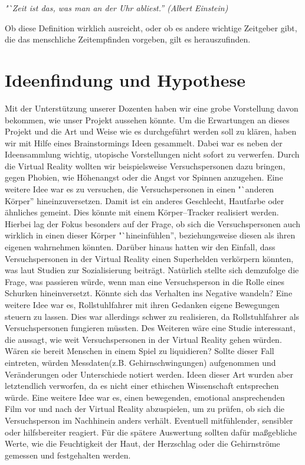 \documentclass{Bericht}
\begin{document}
	\textit{"`Zeit ist das, was man an der Uhr abliest.'' (Albert Einstein)}

	Ob diese Definition wirklich ausreicht, oder ob es andere wichtige Zeitgeber gibt, die das menschliche Zeitempfinden vorgeben, gilt es herauszufinden. 

\section{Ideenfindung und Hypothese} %
	Mit der Unterstützung unserer Dozenten haben wir eine grobe Vorstellung davon bekommen, wie unser Projekt aussehen könnte. Um die Erwartungen an dieses Projekt und die Art und Weise wie es durchgeführt werden soll zu klären, haben wir mit Hilfe eines Brainstormings Ideen gesammelt. Dabei war es neben der Ideensammlung wichtig, utopische Vorstellungen nicht sofort zu verwerfen. Durch die Virtual Reality wollten wir beispielsweise Versuchspersonen dazu bringen, gegen Phobien, wie Höhenangst oder die Angst vor Spinnen anzugehen. Eine weitere Idee war es zu versuchen, die Versuchspersonen in einen "`anderen Körper'' hineinzuversetzen. Damit ist ein anderes Geschlecht, Hautfarbe oder ähnliches gemeint. Dies könnte mit einem Körper–Tracker realisiert werden. Hierbei lag der Fokus besonders auf der Frage, ob sich die Versuchspersonen auch wirklich in einen dieser Körper "`hineinfühlen'', beziehungsweise diesen als ihren eigenen wahrnehmen könnten. Darüber hinaus hatten wir den Einfall, dass Versuchspersonen in der Virtual Reality einen Superhelden verkörpern könnten, was laut Studien zur Sozialisierung beiträgt. 
Natürlich stellte sich demzufolge die Frage, was passieren würde, wenn man eine Versuchsperson in die Rolle eines Schurken hineinversetzt. Könnte sich das Verhalten ins Negative wandeln? Eine weitere Idee war es, Rollstuhlfahrer mit ihren Gedanken eigene Bewegungen steuern zu lassen. Dies war allerdings schwer zu realisieren, da Rollstuhlfahrer als Versuchspersonen fungieren müssten. Des Weiteren wäre eine Studie interessant, die aussagt, wie weit Versuchspersonen in der Virtual Reality gehen würden. Wären sie bereit Menschen in einem Spiel zu liquidieren? Sollte dieser Fall eintreten, würden Messdaten(z.B. Gehirnschwingungen) aufgenommen und Veränderungen oder Unterschiede notiert werden. Ideen dieser Art wurden aber letztendlich verworfen, da es nicht einer ethischen Wissenschaft entsprechen würde. Eine weitere Idee war es, einen bewegenden, emotional ansprechenden Film vor und nach der Virtual Reality abzuspielen, um zu prüfen, ob sich die Versuchsperson im Nachhinein anders verhält. Eventuell mitfühlender, sensibler oder hilfsbereiter reagiert. Für die spätere Auswertung sollten dafür maßgebliche Werte, wie die Feuchtigkeit der Haut, der Herzschlag oder die Gehirnströme gemessen und festgehalten werden.
\end{document}
